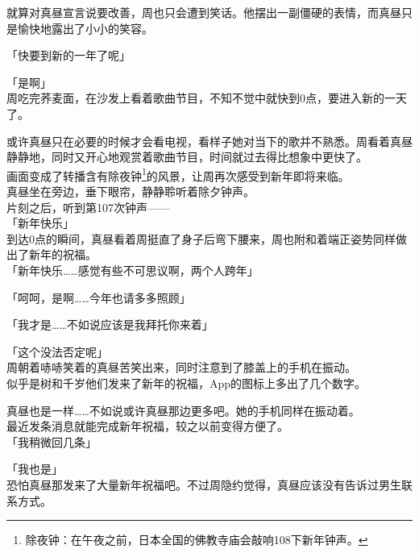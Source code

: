 就算对真昼宣言说要改善，周也只会遭到笑话。他摆出一副僵硬的表情，而真昼只是愉快地露出了小小的笑容。\\

\vspace{2\baselineskip}

「快要到新的一年了呢」

「是啊」\\

周吃完荞麦面，在沙发上看着歌曲节目，不知不觉中就快到0点，要进入新的一天了。

或许真昼只在必要的时候才会看电视，看样子她对当下的歌并不熟悉。周看着真昼静静地，同时又开心地观赏着歌曲节目，时间就过去得比想象中更快了。\\

画面变成了转播含有除夜钟\footnote{除夜钟：在午夜之前，日本全国的佛教寺庙会敲响108下新年钟声。}的风景，让周再次感受到新年即将来临。\\

真昼坐在旁边，垂下眼帘，静静聆听着除夕钟声。\\

片刻之后，听到第107次钟声——\\

「新年快乐」\\

到达0点的瞬间，真昼看着周挺直了身子后弯下腰来，周也附和着端正姿势同样做出了新年的祝福。\\

「新年快乐……感觉有些不可思议啊，两个人跨年」

「呵呵，是啊……今年也请多多照顾」

「我才是……不如说应该是我拜托你来着」

「这个没法否定呢」\\

周朝着哧哧笑着的真昼苦笑出来，同时注意到了膝盖上的手机在振动。\\

似乎是树和千岁他们发来了新年的祝福，App的图标上多出了几个数字。

真昼也是一样……不如说或许真昼那边更多吧。她的手机同样在振动着。\\

最近发条消息就能完成新年祝福，较之以前变得方便了。\\

「我稍微回几条」

「我也是」\\

恐怕真昼那发来了大量新年祝福吧。不过周隐约觉得，真昼应该没有告诉过男生联系方式。\\

